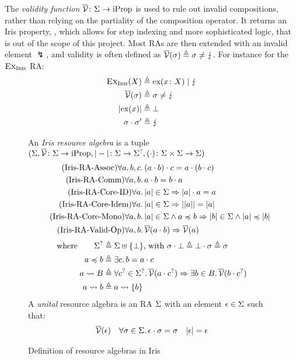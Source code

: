 The \emph{validity function} $\overline{\cal V}\colon \Sigma\rightarrow \text{iProp}$ is used to rule out invalid compositions, rather than relying on the partiality of the composition operator. It returns an Iris property, , which allows for step indexing and more sophisticated logic, that is out of the scope of this project. Most RAs are then extended with an invalid element $\lightning$, and validity is often defined as $\overline{\cal V}(\sigma)\triangleq \sigma\neq \lightning$. For instance for the $\textsc{Ex}_{\textsc{Iris}}$ RA: \begin{align*}
	\textsc{Ex}_{\textsc{Iris}}(X) &\triangleq \text{ex}(x\colon X) \mid \lightning \\
	\overline{\cal V}(\sigma) &\triangleq \sigma \neq \lightning \\
	|\text{ex}(x)| &\triangleq \bot\\
	\sigma \cdot \sigma' &\triangleq \lightning
\end{align*}

\begin{figure}
An \emph{Iris resource algebra} is a tuple $(\Sigma, \overline{\cal V}\colon \Sigma\rightarrow \text{iProp}, |-|\colon \Sigma\rightarrow \Sigma^?, (\cdot)\colon \Sigma\times \Sigma\rightarrow \Sigma)$
\begin{align}
	\tag{Iris-RA-Assoc}
	\forall a,b,c&\ldotp (a\cdot b)\cdot c = a\cdot (b\cdot c)\\
	\tag{Iris-RA-Comm}
	\forall a,b&\ldotp a\cdot b = b\cdot a\\
	\tag{Iris-RA-Core-ID}
	\forall a&\ldotp |a| \in \Sigma \Rightarrow |a|\cdot a = a\\
	\tag{Iris-RA-Core-Idem}
	\forall a&\ldotp |a|\in \Sigma\Rightarrow ||a|| = |a|\\
	\tag{Iris-RA-Core-Mono}
	\forall a,b&\ldotp |a|\in \Sigma\land a\preccurlyeq b \Rightarrow |b| \in \Sigma \land |a| \preccurlyeq |b|\\
	\tag{Iris-RA-Valid-Op}\label{eq:iris-ra-valid-op}
	\forall a,b&\ldotp \overline{\cal V}(a\cdot b)\Rightarrow \overline{\cal V}(a)
\end{align}
\begin{align*}
	\text{where}\qquad
	\Sigma^? &\triangleq \Sigma \uplus \{\bot\}\text{, with }\sigma\cdot \bot \triangleq \bot\cdot \sigma\triangleq \sigma\\
	a \preccurlyeq b &\triangleq \exists c\ldotp b = a\cdot c\\
	a \rightsquigarrow B &\triangleq \forall c^? \in \Sigma^?\ldotp \overline{\cal V}(a\cdot c^?) \Rightarrow \exists b\in B\ldotp \overline{\cal V}(b\cdot c^?)\\
	a \rightsquigarrow b &\triangleq a \rightsquigarrow \{b\}
\end{align*}
A \emph{unital} resource algebra is an RA $\Sigma$ with an element $\epsilon\in\Sigma$ such that:
\begin{align*}
	\overline{\cal V}(\epsilon) &&
	\forall \sigma\in \Sigma\ldotp \epsilon\cdot \sigma = \sigma&&
	|\epsilon|=\epsilon
\end{align*}
\caption{Definition of resource algebras in Iris}
\label{fig:irisra-properties}
\end{figure}

